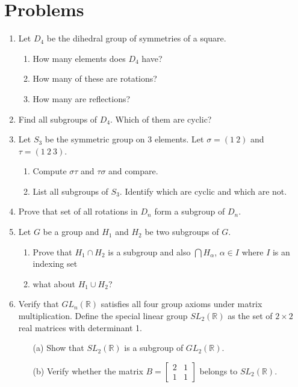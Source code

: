 \documentclass[12pt,a4paper]{article}
\begin{document}
\vspace{0.5cm}



\section{Problems}

\begin{enumerate}
    \item Let $D_4$ be the dihedral group of symmetries of a square.
    \begin{enumerate}
        \item How many elements does $D_4$ have?
        \item How many of these are rotations?
        \item How many are reflections?
    \end{enumerate}

    \item Find all subgroups of $D_4$. Which of them are cyclic?

    \item Let $S_3$ be the symmetric group on 3 elements. Let $\sigma = (1\ 2)$ and $\tau = (1\ 2\ 3)$.
    \begin{enumerate}
        \item Compute $\sigma\tau$ and $\tau\sigma$ and compare.
        \item List all subgroups of $S_3$. Identify which are cyclic and which are not.
    \end{enumerate}

    \item Prove that  set of all rotations in $D_n$ form a subgroup of $D_n$.
    \item Let $G$ be a group and $H_1$ and $H_2$ be two subgroups of $G$.
    \begin{enumerate}
    \item Prove that $H_1\cap H_2$ is a subgroup and also  $\bigcap H_\alpha$, $\alpha \in I$ where $I$ is an indexing set
    \item what about $H_1 \cup H_2$? 
\end{enumerate}
\item Verify that $GL_n(\mathbb{R})$ satisfies all four group axioms under matrix multiplication. Define the special linear group $SL_2(\mathbb{R})$ as the set of $2 \times 2$ real matrices with determinant 1.
\begin{enumerate}
    
  \item[(a)] Show that $SL_2(\mathbb{R})$ is a subgroup of $GL_2(\mathbb{R})$.
  \item[(b)] Verify whether the matrix $B = \begin{bmatrix} 2 & 1 \\ 1 & 1 \end{bmatrix}$ belongs to $SL_2(\mathbb{R})$.
  

\end{enumerate}
\end{enumerate}
\end{document}

